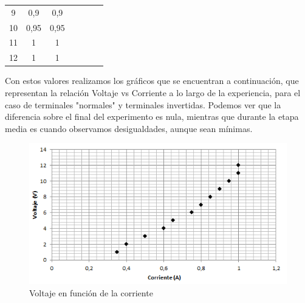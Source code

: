 \documentclass{article}
\begin{document}
\begin{table}[h]
\begin{tabular}{|c|c|c|cccc}
9                                                                & 0,9                    & 0,9                                                                                          &  &  &  &  \\ \cline{1-3}
10                                                               & 0,95                   & 0,95                                                                                         &  &  &  &  \\ \cline{1-3}
11                                                               & 1                      & 1                                                                                            &  &  &  &  \\ \cline{1-3}
12                                                               & 1                      & 1                                                                                            &  &  &  &  \\ \cline{1-3}
\end{tabular}
\end{table}

Con estos valores realizamos los gráficos que se encuentran a continuación, que representan la relación Voltaje vs Corriente a lo largo de la experiencia, para el caso de terminales "normales" y terminales invertidas. Podemos ver que la diferencia sobre el final del experimento es nula, mientras que durante la etapa media es cuando observamos desigualdades, aunque sean mínimas.

\begin{figure}[H]
\centering
\includegraphics[scale=0.7]{lamparitaTerminalsComunes.png}
\caption{Voltaje en función de la corriente}
\end{figure}
\end{document}
